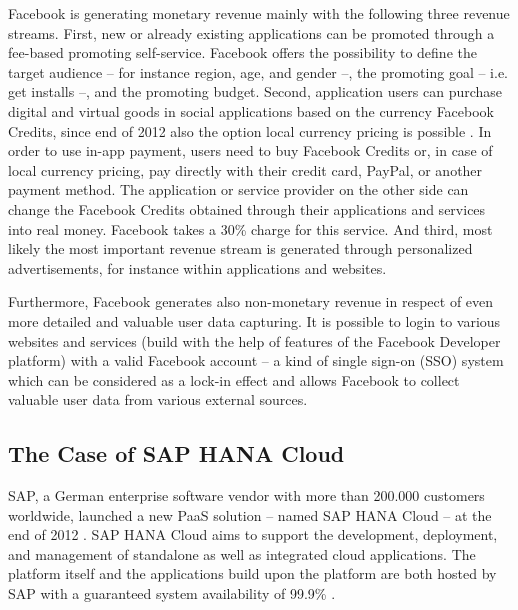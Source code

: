Facebook is generating monetary revenue mainly with the following three revenue streams. First, new or already existing applications can be promoted through a fee-based promoting self-service. Facebook offers the possibility to define the target audience -- for instance region, age, and gender --, the promoting goal -- i.e. get installs --, and the promoting budget. Second, application users can purchase digital and virtual goods in social applications based on the currency Facebook Credits, since end of 2012 also the option local currency pricing is possible \citep{Facebook2013a}. In order to use in-app payment, users need to buy Facebook Credits or, in case of local currency pricing, pay directly with their credit card, PayPal, or another payment method. The application or service provider on the other side can change the Facebook Credits obtained through their applications and services into real money. Facebook takes a 30\% charge for this service. And third, most likely the most important revenue stream is generated through personalized advertisements, for instance within applications and websites.

Furthermore, Facebook generates also non-monetary revenue in respect of even more detailed and valuable user data capturing. It is possible to login to various websites and services (build with the help of features of the Facebook Developer platform) with a valid Facebook account -- a kind of single sign-on (SSO) system which can be considered as a lock-in effect and allows Facebook to collect valuable user data from various external sources.




\subsection{The Case of SAP HANA Cloud}\label{ch:sota:sap}

SAP, a German enterprise software vendor with more than 200.000 customers worldwide, launched a new \ac{PaaS} solution -- named SAP HANA Cloud -- at the end of 2012 \citep{SAP2013b,SAP2013a}. SAP HANA Cloud aims to support the development, deployment, and management of standalone as well as integrated cloud applications. The platform itself and the applications build upon the platform are both hosted by SAP with a guaranteed system availability of 99.9\% \citep{SAP2013b}.

